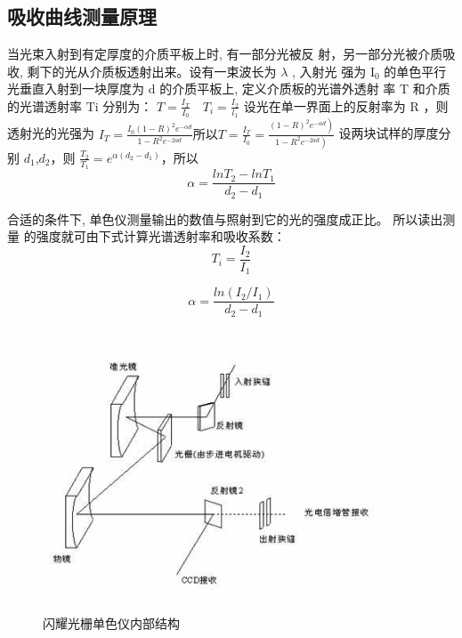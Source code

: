 \documentclass{buaaemp}
\begin{document}
\subsection{吸收曲线测量原理}

当光束入射到有定厚度的介质平板上时, 有一部分光被反 射，另一部分光被介质吸收, 剩下的光从介质板透射出来。设有一束波长为 $ \lambda$ , 入射光 强为  $\mathrm{I}_{0}$  的单色平行光垂直入射到一块厚度为 $ \mathrm{d}$  的介质平板上, 定义介质板的光谱外透射 率  $\mathrm{T} $ 和介质的光谱透射率 $ \mathrm{Ti}$  分别为： $ T=\frac{I_{T}}{I_{0}} \quad T_{i}=\frac{I_{2}}{l_{1}} $ 设光在单一界面上的反射率为 $ \mathrm{R} $ ，则 透射光的光强为 $ I_{T}=\frac{I_{0}(1-R)^{2} e^{-\alpha d}}{1-R^{2} e^{-2 a d}}  所以  T=\frac{I_{T}}{I_{0}}=\frac{\left.(1-R)^{2} e^{-\alpha d}\right)}{\left.1-R^{2} e^{-2 a d}\right)}$  设两块试样的厚度分别 
$d_1$,$d_2$，则 $\frac{T_2}{T_1}=e^{\alpha (d_2-d_1)}$，所以
\begin{equation}
    \alpha=\frac{lnT_2-lnT_1}{d_2-d_1}
\end{equation}

合适的条件下, 单色仪测量输出的数值与照射到它的光的强度成正比。
所以读出测量 的强度就可由下式计算光谱透射率和吸收系数：
\begin{equation}
    T_i=\frac{I_2}{I_1}
\end{equation}

\begin{equation}
    \alpha=\frac{ln(I_2 / I_1)}{d_2-d_1}
\end{equation}

\begin{figure}
    \centering
    \includegraphics[width=\linewidth]{image/OIP-C.jpg}
    \caption{闪耀光栅单色仪内部结构}
    \label{fig:my_label1}
\end{figure}
\end{document}
